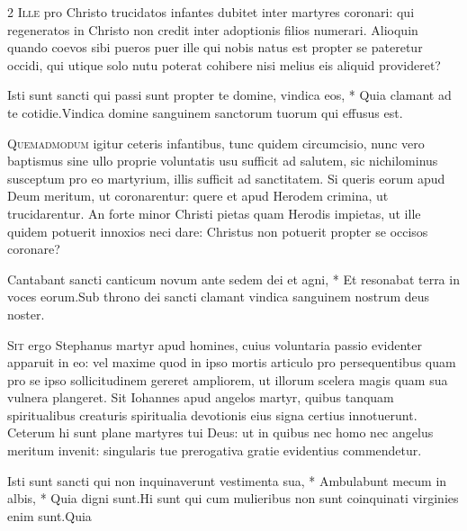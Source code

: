 \begin{multicols*}{2}
\lettrine[lines=2]{\zallmancaps \color{Blue} I}{lle} pro Christo trucidatos infantes dubitet inter martyres coronari: qui regeneratos in Christo non credit inter adoptionis filios numerari. Alioquin quando coevos sibi pueros puer ille qui nobis natus est propter se pateretur occidi, qui utique solo nutu poterat cohibere nisi melius eis aliquid provideret?
\begin{responsory}
{Isti sunt sancti qui passi sunt propter te domine, vindica eos, * Quia clamant ad te cotidie.}{Vindica domine sanguinem sanctorum tuorum qui effusus est.}
\end{responsory}%
\lettrine[lines=2]{\zallmancaps \color{Red} Q}{uemadmodum} igitur ceteris infantibus, tunc quidem circumcisio, nunc vero baptismus sine ullo proprie voluntatis usu sufficit ad salutem, sic nichilominus susceptum pro eo martyrium, illis sufficit ad sanctitatem. Si queris eorum apud Deum meritum, ut coronarentur: quere et apud Herodem crimina, ut trucidarentur. An forte minor Christi pietas quam Herodis impietas, ut ille quidem potuerit innoxios neci dare: Christus non potuerit propter se occisos coronare?
\begin{responsory}
{Cantabant sancti canticum novum ante sedem dei et agni, * Et resonabat terra in voces eorum.}{Sub throno dei sancti clamant vindica sanguinem nostrum deus noster.}
\end{responsory}%
\lettrine[lines=2]{\zallmancaps \color{Blue} S}{it} ergo Stephanus martyr apud homines, cuius voluntaria passio evidenter apparuit in eo: vel maxime quod in ipso mortis articulo pro persequentibus quam pro se ipso sollicitudinem gereret ampliorem, ut illorum scelera magis quam sua vulnera plangeret. Sit Iohannes apud angelos martyr, quibus tanquam spiritualibus creaturis spiritualia devotionis eius signa certius innotuerunt. Ceterum hi sunt plane martyres tui Deus: ut in quibus nec homo nec angelus meritum invenit: singularis tue prerogativa gratie evidentius commendetur.
\begin{responsory-final}
{Isti sunt sancti qui non inquinaverunt vestimenta sua, * Ambulabunt mecum in albis, * Quia digni sunt.}{Hi sunt qui cum mulieribus non sunt coinquinati virginies enim sunt.}{Quia}
\end{responsory-final}%

\end{multicols*}
